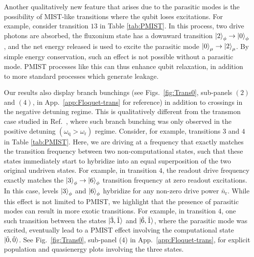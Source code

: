 \documentclass[%
reprint,
superscriptaddress,
 amsmath,amssymb,
 aps,
 prx,
longbibliography,
floatfix,
]{revtex4-2}
\begin{document}
Another qualitatively new feature that arises due to the parasitic modes is the possibility of MIST-like transitions where the qubit loses excitations. For example, consider transition $13$ in Table \ref{tab:PMIST}. In this process, two drive photons are absorbed, the fluxonium state has a downward transition $\ket{2}_\phi\rightarrow\ket{0}_\phi$, and the net energy released is used to excite the parasitic mode $\ket{0}_\mu\rightarrow \ket{2}_\mu$. By simple energy conservation, such an effect is not possible without a parasitic mode. PMIST processes like this can thus enhance qubit relaxation, in addition to more standard processes which generate leakage.  

Our results also display branch bunchings (see Figs.~\ref{fig:Trans0}, sub-panels $(2)$ and $(4)$, in App.~\ref{app:Floquet-trans} for reference) in addition to crossings in the negative detuning regime. This is qualitatively different from the transmon case studied in  Ref.~\cite{dumas2024unified}, where such branch bunching was only observed in the positive detuning $(\omega_\textrm{q}>\omega_\textrm{r})$ regime.  Consider, for example, transitions $3$ and $4$ in Table \ref{tab:PMIST}. Here, we are driving at a frequency that exactly matches the transition frequency between two non-computational states, such that these states immediately start to hybridize into an equal superposition of the two 
original undriven states.  For example, in transition $4$, the readout drive frequency exactly matches the $\ket{3}_\phi \rightarrow \ket{6}_\phi$ transition frequency at zero readout excitations. In this case, levels $\ket{3}_\phi$ and $\ket{6}_\phi$ hybridize for any non-zero drive power $\bar n_\textrm{r}$. While this effect is not limited to PMIST, we highlight that the presence of parasitic modes can result in more exotic transitions. For example, in transition  $4$, one such transition between the states $\ket{\tilde{3},\tilde{1}}$ and $\ket{\tilde{6},\tilde{1}}$, where the parasitic mode was excited, eventually lead to a PMIST effect involving the computational state $\ket{\tilde{0},\tilde{0}}$. See Fig.~\ref{fig:Trans0}, sub-panel ($4$) in App.~\ref{app:Floquet-trans}, for explicit population and quasienergy plots involving the three states.
\end{document}
